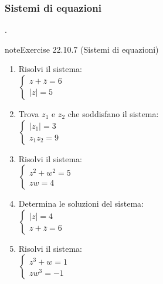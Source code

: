 \documentclass[letterpaper,10pt,italian]{jupyterBook}
\begin{document}
\subsubsection{Sistemi di equazioni}
\label{\detokenize{ch/algebra/complex-algebra-problems:sistemi-di-equazioni}}\label{\detokenize{ch/algebra/complex-algebra-problems:math-hs-algebra-complex-problems-equations-sys}}
\sphinxAtStartPar
{\hyperref[\detokenize{ch/algebra/complex-algebra-sol:math-hs-algebra-complex-sol-equations-sys-sol}]{}}.
 \label{exercise:ch/algebra/complex-algebra-problems-exercise-6}

\begin{sphinxadmonition}{note}{Exercise 22.10.7 (Sistemi di equazioni)}


\begin{enumerate}
%
\item {} 
\sphinxAtStartPar
Risolvi il sistema:\\
\(\begin{cases} 
z + \overline{z} = 6 \\
|z| = 5 
\end{cases}\)

\item {} 
\sphinxAtStartPar
Trova \(z_1\) e \(z_2\) che soddisfano il sistema:\\
\(\begin{cases} 
|z_1| = 3 \\
z_1 z_2 = 9 
\end{cases}\)

\item {} 
\sphinxAtStartPar
Risolvi il sistema:\\
\(\begin{cases} 
z^2 + w^2 = 5 \\
z w = 4 
\end{cases}\)

\item {} 
\sphinxAtStartPar
Determina le soluzioni del sistema:\\
\(\begin{cases} 
|z| = 4 \\
z + \overline{z} = 6 
\end{cases}\)

\item {} 
\sphinxAtStartPar
Risolvi il sistema:\\
\(\begin{cases} 
z^3 + w = 1 \\
z w^3 = -1 
\end{cases}\)


\end{enumerate}
\end{sphinxadmonition}
\end{document}
